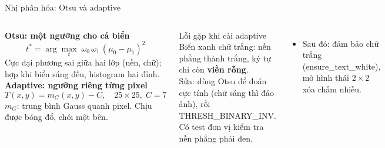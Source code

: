 \documentclass[aspectratio=169,11pt]{beamer}
\newcommand{\code}[1]{{\footnotesize\ttfamily #1}}
\newcommand{\hl}[1]{\textcolor{accentdark}{\textbf{#1}}}
\begin{document}
\begin{frame}{Nhị phân hóa: Otsu và adaptive}
  \begin{columns}[T]
    {\bfseries\color{accentdark}Otsu: một ngưỡng cho cả biển}
    \[t^{*}=\arg\max_{t}\;\omega_0\,\omega_1\,(\mu_0-\mu_1)^2\]
    {\small Cực đại phương sai giữa hai lớp (nền, chữ); hợp khi biển sáng đều, histogram hai đỉnh.}\\[3mm]
    {\bfseries\color{accentdark}Adaptive: ngưỡng riêng từng pixel}
    \[T(x,y)=m_G(x,y)-C,\quad 25\times25,\; C=7\]
    {\small $m_G$: trung bình Gauss quanh pixel. Chịu được bóng đổ, chói một bên.}
    \begin{block}{Lỗi gặp khi cài adaptive}
      \small Biển xanh chữ trắng: nền phẳng thành trắng, ký tự chỉ còn \hl{viền rỗng}.\\[1mm]
      Sửa: dùng Otsu để đoán cực tính (chữ sáng thì đảo ảnh), rồi \code{THRESH\_BINARY\_INV}. Có test đơn vị kiểm tra nền phẳng phải đen.
    \end{block}
    \vspace{2mm}
    \begin{itemize}
      \item Sau đó: đảm bảo chữ trắng (\code{ensure\_text\_white}), mở hình thái $2\times2$ xóa chấm nhiễu.
    \end{itemize}
  \end{columns}
\end{frame}
\end{document}
